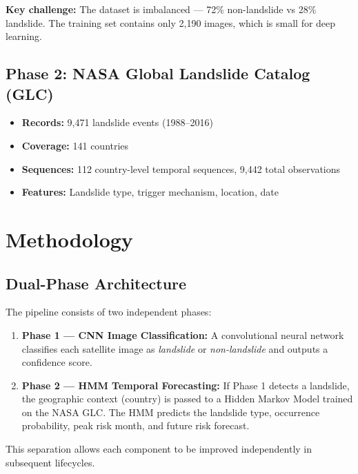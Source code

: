 \documentclass[11pt]{article}
\begin{document}
\noindent \textbf{Key challenge:} The dataset is imbalanced --- 72\% non-landslide vs 28\% landslide. The training set contains only 2,190 images, which is small for deep learning.

\subsection{Phase 2: NASA Global Landslide Catalog (GLC)}

\begin{itemize}[noitemsep]
    \item \textbf{Records:} 9,471 landslide events (1988--2016)
    \item \textbf{Coverage:} 141 countries
    \item \textbf{Sequences:} 112 country-level temporal sequences, 9,442 total observations
    \item \textbf{Features:} Landslide type, trigger mechanism, location, date
\end{itemize}

\section{Methodology}

\subsection{Dual-Phase Architecture}

The pipeline consists of two independent phases:

\begin{enumerate}
    \item \textbf{Phase 1 --- CNN Image Classification:} A convolutional neural network classifies each satellite image as \textit{landslide} or \textit{non-landslide} and outputs a confidence score.
    \item \textbf{Phase 2 --- HMM Temporal Forecasting:} If Phase 1 detects a landslide, the geographic context (country) is passed to a Hidden Markov Model trained on the NASA GLC. The HMM predicts the landslide type, occurrence probability, peak risk month, and future risk forecast.
\end{enumerate}

\noindent This separation allows each component to be improved independently in subsequent lifecycles.
\end{document}
